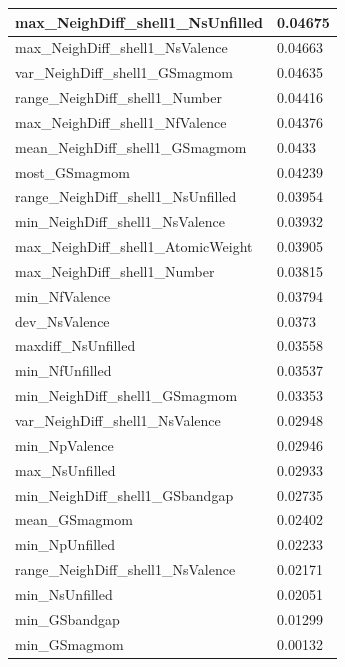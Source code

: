 \begin{longtable}{|l|l|}
max\_NeighDiff\_shell1\_NsUnfilled & 0.04675 \\ \hline
max\_NeighDiff\_shell1\_NsValence & 0.04663 \\ \hline
var\_NeighDiff\_shell1\_GSmagmom & 0.04635 \\ \hline
range\_NeighDiff\_shell1\_Number & 0.04416 \\ \hline
max\_NeighDiff\_shell1\_NfValence & 0.04376 \\ \hline
mean\_NeighDiff\_shell1\_GSmagmom & 0.0433 \\ \hline
most\_GSmagmom & 0.04239 \\ \hline
range\_NeighDiff\_shell1\_NsUnfilled & 0.03954 \\ \hline
min\_NeighDiff\_shell1\_NsValence & 0.03932 \\ \hline
max\_NeighDiff\_shell1\_AtomicWeight & 0.03905 \\ \hline
max\_NeighDiff\_shell1\_Number & 0.03815 \\ \hline
min\_NfValence & 0.03794 \\ \hline
dev\_NsValence & 0.0373 \\ \hline
maxdiff\_NsUnfilled & 0.03558 \\ \hline
min\_NfUnfilled & 0.03537 \\ \hline
min\_NeighDiff\_shell1\_GSmagmom & 0.03353 \\ \hline
var\_NeighDiff\_shell1\_NsValence & 0.02948 \\ \hline
min\_NpValence & 0.02946 \\ \hline
max\_NsUnfilled & 0.02933 \\ \hline
min\_NeighDiff\_shell1\_GSbandgap & 0.02735 \\ \hline
mean\_GSmagmom & 0.02402 \\ \hline
min\_NpUnfilled & 0.02233 \\ \hline
range\_NeighDiff\_shell1\_NsValence & 0.02171 \\ \hline
min\_NsUnfilled & 0.02051 \\ \hline
min\_GSbandgap & 0.01299 \\ \hline
min\_GSmagmom & 0.00132 \\ \hline
\end{longtable}